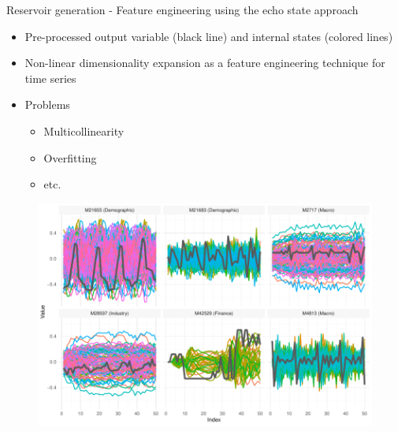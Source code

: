 \documentclass[aspectratio=169]{beamer}
\begin{document}
\begin{frame}[t]{Reservoir generation - Feature engineering using the echo state approach}
    \begin{minipage}[t]{0.3\textwidth}
        \vspace{0pt}
        \begin{itemize}
            \item Pre-processed output variable (black line) and internal states (colored lines)
			\item Non-linear dimensionality expansion as a feature engineering technique for time series
			\item Problems
				\begin{itemize}
					\item Multicollinearity
					\item Overfitting
					\item etc.
				\end{itemize}
        \end{itemize}
    \end{minipage}%
    \hfill
    \begin{minipage}[t]{0.7\textwidth}
        \vspace{0pt}
 		\begin{figure}[H]
		\center
			\includegraphics[scale=0.7]{figures/figure_05_model_states_wide.pdf}
		\end{figure}
    \end{minipage}
\end{frame}
\end{document}
